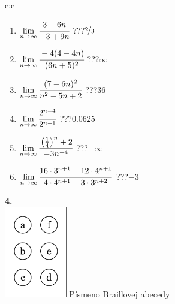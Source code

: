 \documentclass[10pt]{report}
\begin{document}
\begin{tabular}{c:c}
\begin{minipage}[c][104.5mm][t]{0.5\linewidth}
\begin{center}
\begin{minipage}{0.79\linewidth}
\begin{center}
\begin{varwidth}{\linewidth}
\begin{enumerate}
\normalsize
\item $\lim\limits_{n\to\infty}\cfrac{3+6n}{-3+9n}$\quad \dotfill\; ???\;\dotfill \quad $\nicefrac{2}{3}$
\item $\lim\limits_{n\to\infty}\cfrac{-4(4-4n)}{(6n+5)^2}$\quad \dotfill\; ???\;\dotfill \quad $\infty$
\item $\lim\limits_{n\to\infty}\cfrac{(7-6n)^2}{n^2-5n+2}$\quad \dotfill\; ???\;\dotfill \quad $36$
\item $\lim\limits_{n\to\infty}\cfrac{2^{n-4}}{2^{n-1}}$\quad \dotfill\; ???\;\dotfill \quad $0.0625$
\item $\lim\limits_{n\to\infty}\cfrac{\left(\frac{1}{4}\right)^n +2}{-3n^{-4}}$\quad \dotfill\; ???\;\dotfill \quad $-\infty$
\item $\lim\limits_{n\to\infty}\cfrac{16\cdot 3^{n+1}-12\cdot 4^{n+1}}{4\cdot 4^{n+1}+3\cdot 3^{n+2}}$\quad \dotfill\; ???\;\dotfill \quad $-3$
\end{enumerate}
\end{varwidth}
\end{center}
\end{minipage}
\begin{minipage}{0.20\linewidth}
\begin{center}
{\Huge\bfseries 4.} \\[2mm]
\includegraphics[height=40mm]{../images/braille.png}
{\small Písmeno Braillovej abecedy}
\end{center}
\end{minipage}
\end{center}
\end{minipage}
%
\end{tabular}
\newpage
\thispagestyle{empty}
\end{document}
